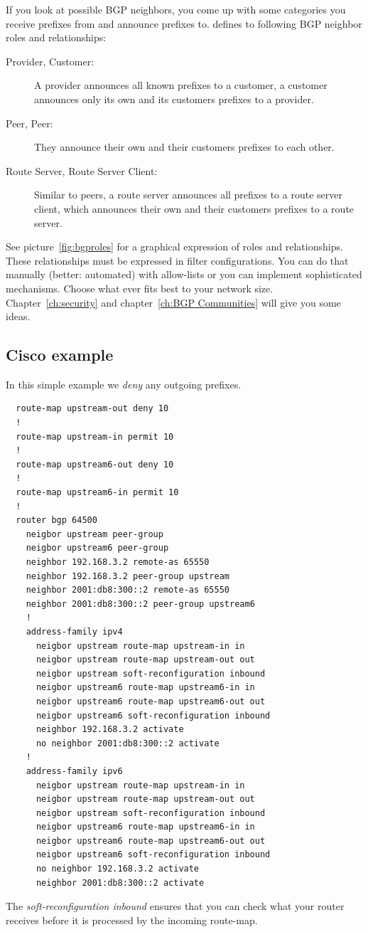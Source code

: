 If you look at possible BGP neighbors, you come up with some categories you receive prefixes from and announce prefixes to.  defines to following BGP neighbor roles and relationships:
\begin{description}
  \item[Provider, Customer:] A provider announces all known prefixes to a customer, a customer announces only its own and its customers prefixes to a provider.
  \item[Peer, Peer:] They announce their own and their customers prefixes to each other.
  \item[Route Server, Route Server Client:] Similar to peers, a route server announces all prefixes to a route server client, which announces their own and their customers prefixes to a route server.     
\end{description}
See picture~\ref{fig:bgproles} for a graphical expression of roles and relationships.
These relationships must be expressed in filter configurations. You can do that manually (better: automated) with allow-lists or you can implement sophisticated mechanisms. Choose what ever fits best to your network size. Chapter~\ref{ch:security} and chapter~\ref{ch:BGP Communities} will give you some ideas.

\subsection{Cisco example}
In this simple example we \emph{deny} any outgoing prefixes.
\begin{verbatim}
  route-map upstream-out deny 10
  !
  route-map upstream-in permit 10
  !
  route-map upstream6-out deny 10
  !
  route-map upstream6-in permit 10
  !
  router bgp 64500
    neigbor upstream peer-group
    neigbor upstream6 peer-group
    neighbor 192.168.3.2 remote-as 65550
    neighbor 192.168.3.2 peer-group upstream
    neighbor 2001:db8:300::2 remote-as 65550
    neighbor 2001:db8:300::2 peer-group upstream6
    !
    address-family ipv4
      neigbor upstream route-map upstream-in in
      neigbor upstream route-map upstream-out out
      neigbor upstream soft-reconfiguration inbound
      neigbor upstream6 route-map upstream6-in in
      neigbor upstream6 route-map upstream6-out out
      neigbor upstream6 soft-reconfiguration inbound
      neighbor 192.168.3.2 activate
      no neighbor 2001:db8:300::2 activate
    !
    address-family ipv6
      neigbor upstream route-map upstream-in in
      neigbor upstream route-map upstream-out out
      neigbor upstream soft-reconfiguration inbound
      neigbor upstream6 route-map upstream6-in in
      neigbor upstream6 route-map upstream6-out out
      neigbor upstream6 soft-reconfiguration inbound
      no neighbor 192.168.3.2 activate
      neighbor 2001:db8:300::2 activate
\end{verbatim}
The \emph{soft-reconfiguration inbound} ensures that you can check what your router receives before it is processed by the incoming route-map.


